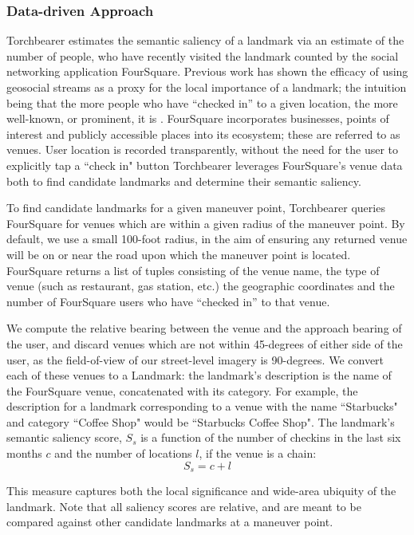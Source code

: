 \subsubsection{Data-driven Approach}\label{Sect:desc:data}
Torchbearer estimates the semantic saliency of a landmark via an estimate of the number of people, who have recently visited the landmark counted by the social networking application FourSquare. Previous work has shown the efficacy of using geosocial streams as a proxy for the local importance of a landmark; the intuition being that the more people who have “checked in” to a given location, the more well-known, or prominent, it is \cite{quesnot2014measure}. FourSquare incorporates businesses, points of interest and publicly accessible places into its ecosystem; these are referred to as venues. User location is recorded transparently, without the need for the user to explicitly tap a ``check in" button Torchbearer leverages FourSquare’s venue data both to find candidate landmarks and determine their semantic saliency. 

To find candidate landmarks for a given maneuver point, Torchbearer queries FourSquare for venues which are within a given radius of the maneuver point. By default, we use a small 100-foot radius, in the aim of ensuring any returned venue will be on or near the road upon which the maneuver point is located. FourSquare returns a list of tuples consisting of the venue name, the type of venue (such as restaurant, gas station, etc.) the geographic coordinates and the number of FourSquare users who have “checked in” to that venue. 

We compute the relative bearing between the venue and the approach bearing of the user, and discard venues which are not within 45-degrees of either side of the user, as the field-of-view of our street-level imagery is 90-degrees. We convert each of these venues to a Landmark: the landmark's description is the name of the FourSquare venue, concatenated with its category. For example, the description for a landmark corresponding to a venue with the name ``Starbucks" and category ``Coffee Shop" would be ``Starbucks Coffee Shop". The landmark’s semantic saliency score, $S_s$ is a function of the number of checkins in the last six months $c$ and the number of locations $l$, if the venue is a chain:
\begin{equation}
    S_s = c + l
\end{equation}

This measure captures both the local significance and wide-area ubiquity of the landmark. Note that all saliency scores are relative, and are meant to be compared against other candidate landmarks at a maneuver point.

